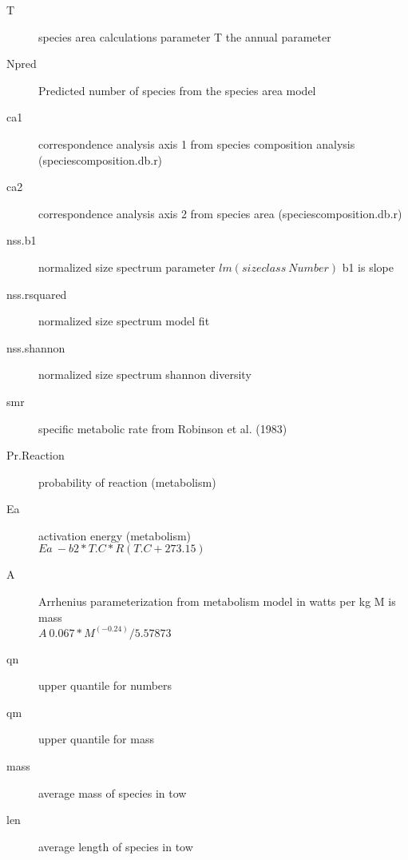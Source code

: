 \documentclass[10pt,letter,twocolumn]{article}
\begin{document}
\begin{description}
	\item[T] species area calculations parameter T the annual parameter
	\item[Npred] Predicted number of species from the species area model
	\item[ca1] correspondence analysis axis 1 from species composition analysis (speciescomposition.db.r)
	\item[ca2] correspondence analysis axis 2 from species area (speciescomposition.db.r)
	\item[nss.b1] normalized size spectrum parameter $lm(sizeclass~Number)$ b1 is slope
	\item[nss.rsquared] normalized size spectrum model fit
	\item[nss.shannon] normalized size spectrum shannon diversity
	\item[smr] specific metabolic rate from Robinson et al. (1983)
	\item[Pr.Reaction] probability of reaction (metabolism)
	\item[Ea] activation energy (metabolism) \\$Ea ~ -b2 * T.C * R (T.C +273.15)$
	\item[A] Arrhenius parameterization from metabolism model in watts per kg M is mass \\ $A  ~ 0.067 * M^(-0.24) / 5.57873 $
	\item[qn] upper quantile for numbers
	\item[qm] upper quantile for mass
	\item[mass] average mass of species in tow
	\item[len] average length of species in tow
	
	
\end{description}
\end{document}

